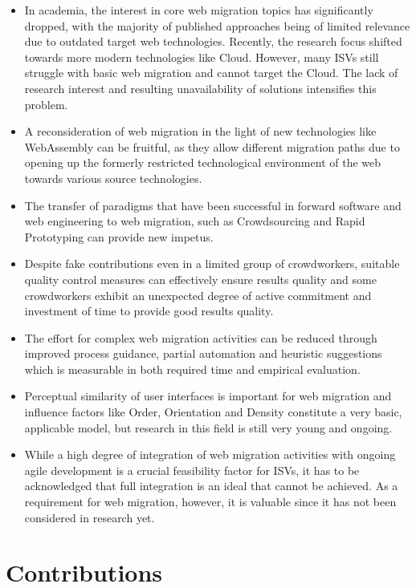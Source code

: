 \begin{itemize}
\tightlist
\item
  In academia, the interest in core web migration topics has significantly dropped, with the majority of published approaches being of limited relevance due to outdated target web technologies.
Recently, the research focus shifted towards more modern technologies like Cloud.
However, many ISVs still struggle with basic web migration and cannot target the Cloud.
The lack of research interest and resulting unavailability of solutions intensifies this problem.
\item
  A reconsideration of web migration in the light of new technologies like WebAssembly can be fruitful, as they allow different migration paths due to opening up the formerly restricted technological environment of the web towards various source technologies.
\item
  The transfer of paradigms that have been successful in forward software and web engineering to web migration, such as Crowdsourcing and Rapid Prototyping can provide new impetus.
\item
  Despite fake contributions even in a limited group of crowdworkers, suitable quality control measures can effectively ensure results quality and some crowdworkers exhibit an unexpected degree of active commitment and investment of time to provide good results quality.
\item
  The effort for complex web migration activities can be reduced through improved process guidance, partial automation and heuristic suggestions which is measurable in both required time and empirical evaluation.
\item
  Perceptual similarity of user interfaces is important for web migration and influence factors like Order, Orientation and Density constitute a very basic, applicable model, but research in this field is still very young and ongoing.
\item
  While a high degree of integration of web migration activities with ongoing agile development is a crucial feasibility factor for ISVs, it has to be acknowledged that full integration is an ideal that cannot be achieved.
As a requirement for web migration, however, it is valuable since it has not been considered in research yet.
\end{itemize}

\hypertarget{contributions}{%
\section{Contributions}\label{contributions}}

